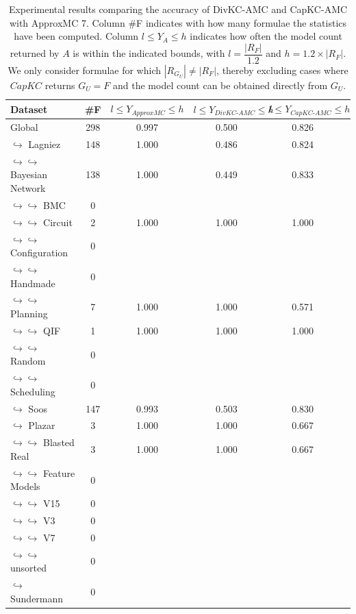 \documentclass{article}
\newcommand\approxmc[0]{ApproxMC\xspace}
\newcommand\divkcamc[0]{DivKC-AMC\xspace}
\newcommand\capkc[0]{CapKC\xspace}
\newcommand\capkcamc[0]{CapKC-AMC\xspace}
\begin{document}
    
\begin{table}[h!]
        \centering
            \begin{tabular}{l|c|c|c|c|c}
                Dataset & \#F & $l \leq Y_{\textit{\approxmc}} \leq h$ & $l \leq Y_{\textit{\divkcamc}} \leq h$ & $l \leq Y_{\textit{\capkcamc}} \leq h$ \\ 
                \hline 
Global & 298 & 0.997 & 0.500 & 0.826 \\
$\hookrightarrow$ Lagniez \cite{D4} & 148 & 1.000 & 0.486 & 0.824 \\
$\hookrightarrow \hookrightarrow$ Bayesian Network & 138 & 1.000 & 0.449 & 0.833 \\
$\hookrightarrow \hookrightarrow$ BMC & 0 & & & & \\
$\hookrightarrow \hookrightarrow$ Circuit & 2 & 1.000 & 1.000 & 1.000 \\
$\hookrightarrow \hookrightarrow$ Configuration & 0 & & & & \\
$\hookrightarrow \hookrightarrow$ Handmade & 0 & & & & \\
$\hookrightarrow \hookrightarrow$ Planning & 7 & 1.000 & 1.000 & 0.571 \\
$\hookrightarrow \hookrightarrow$ QIF & 1 & 1.000 & 1.000 & 1.000 \\
$\hookrightarrow \hookrightarrow$ Random & 0 & & & & \\
$\hookrightarrow \hookrightarrow$ Scheduling & 0 & & & & \\
$\hookrightarrow$ Soos \cite{soos_2024_10449477} & 147 & 0.993 & 0.503 & 0.830 \\
$\hookrightarrow$ Plazar \cite{Plazar2019} & 3 & 1.000 & 1.000 & 0.667 \\
$\hookrightarrow \hookrightarrow$ Blasted Real & 3 & 1.000 & 1.000 & 0.667 \\
$\hookrightarrow \hookrightarrow$ Feature Models & 0 & & & & \\
$\hookrightarrow \hookrightarrow$ V15 & 0 & & & & \\
$\hookrightarrow \hookrightarrow$ V3 & 0 & & & & \\
$\hookrightarrow \hookrightarrow$ V7 & 0 & & & & \\
$\hookrightarrow \hookrightarrow$ unsorted & 0 & & & & \\
$\hookrightarrow$ Sundermann \cite{SBK+:SPLC24} & 0 & & & & \\
            \end{tabular}
                \caption{Experimental results comparing the accuracy of \divkcamc and \capkcamc with \approxmc7.
            Column \#F indicates with how many formulae the statistics have been computed.
            Column $l \leq Y_{A} \leq h$ indicates how often the model count returned by $A$ is within the indicated bounds, with $l = \dfrac{|R_F|}{1.2}$ and $h = 1.2 \times |R_F|$.
            We only consider formulae for which $|R_{G_U}| \neq |R_F|$, thereby excluding cases where $\capkc$ returns $G_U = F$ and the model count can be obtained directly from $G_U$.
        }
        \label{divkc:tab:appmc:acc:filter}
    \end{table}
\end{document}

